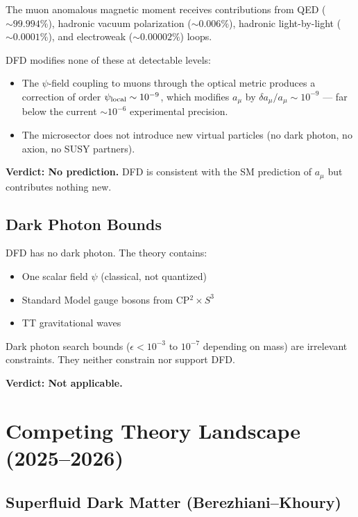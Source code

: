 \documentclass[11pt]{article}
\begin{document}
The muon anomalous magnetic moment receives contributions from
QED ($\sim 99.994\%$), hadronic vacuum polarization ($\sim 0.006\%$),
hadronic light-by-light ($\sim 0.0001\%$), and electroweak
($\sim 0.00002\%$) loops.

DFD modifies none of these at detectable levels:
\begin{itemize}
\item The $\psi$-field coupling to muons through the optical metric
  produces a correction of order $\psi_{\rm local} \sim 10^{-9}$,
  which modifies $a_\mu$ by $\delta a_\mu/a_\mu \sim 10^{-9}$
  --- far below the current $\sim 10^{-6}$ experimental precision.
\item The microsector does not introduce new virtual particles
  (no dark photon, no axion, no SUSY partners).
\end{itemize}

\textbf{Verdict: No prediction.}  DFD is consistent with the
SM prediction of $a_\mu$ but contributes nothing new.

\subsection{Dark Photon Bounds}

DFD has no dark photon.  The theory contains:
\begin{itemize}
\item One scalar field $\psi$ (classical, not quantized)
\item Standard Model gauge bosons from CP$^2 \times S^3$
\item TT gravitational waves
\end{itemize}

Dark photon search bounds ($\epsilon < 10^{-3}$ to $10^{-7}$
depending on mass) are irrelevant constraints.  They neither
constrain nor support DFD.

\textbf{Verdict: Not applicable.}


\section{Competing Theory Landscape (2025--2026)}
\label{sec:competing}

\subsection{Superfluid Dark Matter (Berezhiani--Khoury)}
\end{document}
